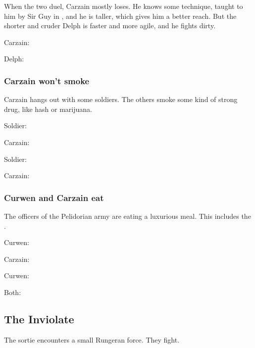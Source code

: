 When the two duel, Carzain mostly loses. He knows some technique, taught to him by Sir Guy in \Redglen, and he is taller, which gives him a better reach. But the shorter and cruder Delph is faster and more agile, and he fights dirty. 

Carzain: 

Delph: 





\subsubsection{Carzain won't smoke}
Carzain hangs out with some soldiers. The others smoke some kind of strong drug, like hash or marijuana. 

\begin{prose}
  Soldier: 
  
  Carzain: 
  
  Soldier: 
  
  Carzain: 
\end{prose}





\subsubsection{Curwen and Carzain eat}
The officers of the Pelidorian army are eating a luxurious meal. This includes the \ishrah. 

Curwen: 

Carzain: 

Curwen: 

Both: 









\subsection{The \Caliph Inviolate}
The sortie encounters a small Rungeran force. They fight. 


